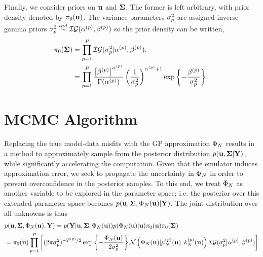 \documentclass[12pt]{article}
\begin{document}
Finally, we consider priors on $\bpar$ and $\CovObs$. The former is left arbitrary, with prior density denoted by $\priorDens(\bpar)$. 
The variance parameters $\sdObs_{\objIdx}^2$ are assigned inverse gamma priors $\sdObs_{\objIdx}^2 \overset{ind}{\sim} \mathcal{IG}(\indexObj{\IGShape}, \indexObj{\IGScale})$ so the
prior density can be written, 
\begin{align}
\priorDens(\CovObs) 
&= \prod_{\objIdx = 1}^{\Nobj} \mathcal{IG}(\sdObs_{\objIdx}^2|\indexObj{\IGShape}, \indexObj{\IGScale}). \label{inv_gamma_prior} \\
&= \prod_{\objIdx = 1}^{\Nobj} \frac{\left[ \indexObj{\IGScale}\right]^{\indexObj{\IGShape}}}{\Gamma(\indexObj{\IGShape})} \left(\frac{1}{\sdObs^2_{\objIdx}}\right)^{\indexObj{\IGShape}+1} 
\exp\left\{-\frac{\indexObj{\IGScale}}{\sdObs^2_{\objIdx}} \right\}. \nonumber
\end{align}

\section{MCMC Algorithm}
Replacing the true model-data misfits with the GP approximation $\indexDesign[\Ndesign]{\SSR} $ results in a method to approximately sample from the posterior 
distribution $p(\bpar, \CovObs | \stateMat)$, while significantly accelerating the computation. Given that the emulator induces approximation error, we seek to 
propagate the uncertainty in $\indexDesign[\Ndesign]{\SSR}$ in order to prevent overconfidence in the posterior samples. To this end, we treat $\indexDesign[\Ndesign]{\SSR}$
as another variable to be explored in the parameter space; i.e. the posterior over this extended parameter space becomes 
$p(\bpar, \CovObs, \indexDesign[\Ndesign]{\SSR}(\bpar) | \stateMat)$. The joint distribution over all unknowns is thus 
\begin{align*}
&p(\bpar, \CovObs, \indexDesign[\Ndesign]{\SSR}(\bpar), \stateMat) = 
p(\stateMat | \bpar, \CovObs, \indexDesign[\Ndesign]{\SSR}(\bpar))p(\indexDesign[\Ndesign]{\SSR}(\bpar) | \bpar) \priorDens(\bpar) \priorDens(\CovObs) \\
&= \priorDens(\bpar) \prod_{\objIdx=1}^{\Nobj} \left[(2\pi\sdObs^2_{\objIdx})^{-\indexObj{\Ntime}/2} \exp\left\{-\frac{\indexDesign[\Ndesign]{\SSR}(\bpar)}{2\sdObs^2_{\objIdx}} \right\} 
\Gaussian\left(\indexDesign[\Ndesign]{\SSR}(\bpar) | \GPMeanPredOut{\Ndesign}{\objIdx}(\bpar), \GPKerPredOut{\Ndesign}{\objIdx}(\bpar)\right) \mathcal{IG}(\sdObs^2_{\objIdx}| \indexObj{\IGShape}, \indexObj{\IGScale}) \right] 
\end{align*}
\end{document}
